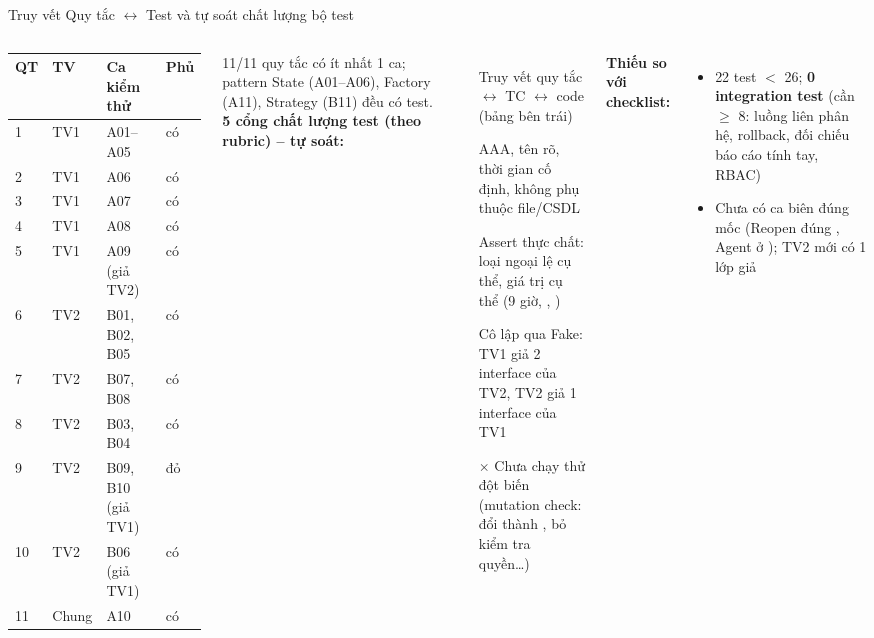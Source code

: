 \begin{frame}{Truy vết Quy tắc $\leftrightarrow$ Test và tự soát chất lượng bộ test}
\begin{columns}[T]
\tiny
\begin{tabular}{@{}L{0.5cm}L{0.6cm}L{2.6cm}L{1.0cm}@{}}
\toprule
\textbf{QT} & \textbf{TV} & \textbf{Ca kiểm thử} & \textbf{Phủ} \\
 & TV1 & A01--A05 & \textcolor{okc}{có} \\
2 & TV1 & A06 & \textcolor{okc}{có} \\
3 & TV1 & A07 & \textcolor{okc}{có} \\
4 & TV1 & A08 & \textcolor{okc}{có} \\
5 & TV1 & A09 (giả TV2) & \textcolor{okc}{có} \\
6 & TV2 & B01, B02, B05 & \textcolor{okc}{có} \\
7 & TV2 & B07, B08 & \textcolor{okc}{có} \\
8 & TV2 & B03, B04 & \textcolor{okc}{có} \\
9 & TV2 & B09, B10 (giả TV1) & \textcolor{warn}{đỏ} \\
10 & TV2 & B06 (giả TV1) & \textcolor{okc}{có} \\
11 & Chung & A10 & \textcolor{okc}{có} \\
\bottomrule
\end{tabular}

\vspace{1mm}
11/11 quy tắc có ít nhất 1 ca; pattern State (A01--A06), Factory (A11), Strategy (B11) đều có test.
\scriptsize
\textbf{5 cổng chất lượng test (theo rubric) -- tự soát:}
\begin{itemize}
  \item[\textcolor{okc}{\checkmark}] Truy vết quy tắc $\leftrightarrow$ TC $\leftrightarrow$ code (bảng bên trái)
  \item[\textcolor{okc}{\checkmark}] AAA, tên rõ, thời gian cố định, không phụ thuộc file/CSDL
  \item[\textcolor{okc}{\checkmark}] Assert thực chất: loại ngoại lệ cụ thể, giá trị cụ thể (9 giờ, , )
  \item[\textcolor{okc}{\checkmark}] Cô lập qua Fake: TV1 giả 2 interface của TV2, TV2 giả 1 interface của TV1
  \item[\textcolor{warn}{$\times$}] Chưa chạy thử đột biến (mutation check: đổi \code{>} thành \code{>=}, bỏ kiểm tra quyền\ldots)
\end{itemize}
\textbf{Thiếu so với checklist:}
\begin{itemize}
  \item 22 test $<$ 26; \textbf{0 integration test} (cần $\ge$ 8: luồng liên phân hệ, rollback, đối chiếu báo cáo tính tay, RBAC)
  \item Chưa có ca biên đúng mốc (Reopen đúng , Agent ở ); TV2 mới có 1 lớp giả
\end{itemize}
\end{columns}
\end{frame}
